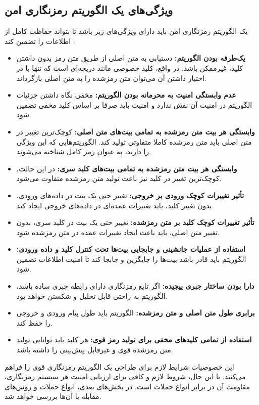 \subsection{ویژگی‌های یک الگوریتم رمزنگاری امن}

یک الگوریتم رمزنگاری امن باید دارای ویژگی‌های زیر باشد تا بتواند حفاظت کامل از اطلاعات را تضمین کند \cite{ref31}:

\begin{itemize}
    \item \textbf{یک‌طرفه بودن الگوریتم:} دستیابی به متن اصلی از طریق متن رمز بدون داشتن کلید، غیرممکن باشد. در واقع، کلید خصوصی مانند دریچه‌ای است که تنها با در اختیار داشتن آن می‌توان متن رمزشده را به متن اصلی بازگرداند.
    \item \textbf{عدم وابستگی امنیت به محرمانه بودن الگوریتم:} مخفی نگاه داشتن جزئیات الگوریتم در امنیت آن نقش ندارد و امنیت باید صرفا بر اساس کلید مخفی تضمین شود.
    \item \textbf{وابستگی هر بیت متن رمزشده به تمامی بیت‌های متن اصلی:} کوچک‌ترین تغییر در متن اصلی باید متن رمزشده کاملا متفاوتی تولید کند. الگوریتم‌هایی که این ویژگی را دارند، به عنوان رمز کامل شناخته می‌شوند.
    \item \textbf{وابستگی هر بیت متن رمزشده به تمامی بیت‌های کلید سری:} در این حالت، کوچک‌ترین تغییر در کلید نیز باعث تولید متن رمزشده متفاوت می‌شود.
    \item \textbf{تأثیر تغییرات کوچک ورودی بر خروجی:} تغییر حتی یک بیت در داده‌های ورودی، بدون تغییر کلید، باید تغییرات عمده‌ای در داده‌های خروجی ایجاد کند.
    \item \textbf{تأثیر تغییرات کوچک کلید بر متن رمزشده:} تغییر حتی یک بیت در کلید سری، بدون تغییر متن اصلی، باید باعث ایجاد تغییرات عمده در متن رمزشده شود.
    \item \textbf{استفاده از عملیات جانشینی و جابجایی بیت‌ها تحت کنترل کلید و داده ورودی:} الگوریتم باید قادر باشد بیت‌ها را جایگزین و جابجا کند تا امنیت اطلاعات تضمین شود.
    \item \textbf{دارا بودن ساختار جبری پیچیده:} اگر تابع رمزنگاری دارای رابطه جبری ساده باشد، الگوریتم به راحتی قابل تحلیل و شکستن خواهد بود.
    \item \textbf{برابری طول متن اصلی و متن رمزشده:} الگوریتم باید طول پیام ورودی و خروجی را حفظ کند.
    \item \textbf{استفاده از تمامی کلیدهای مخفی برای تولید رمز قوی:} هر کلید باید توانایی تولید متن رمزشده قوی و غیرقابل پیش‌بینی را داشته باشد.
\end{itemize}

این خصوصیات شرایط لازم برای طراحی یک الگوریتم رمزنگاری قوی را فراهم می‌کنند. با این حال، شروط لازم و کافی برای ارزیابی امنیت هر سیستم رمزنگاری، مقاومت آن در برابر انواع حملات است. در بخش‌های بعدی، انواع حملات و روش‌های مقابله با آن‌ها بررسی خواهد شد.

